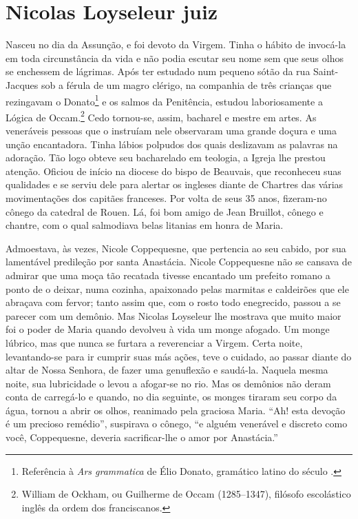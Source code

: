 \chapter{Nicolas Loyseleur juiz}

Nasceu no dia da Assunção, e foi devoto da Virgem. Tinha o hábito de
invocá-la em toda circunstância da vida e não podia escutar seu nome sem
que seus olhos se enchessem de lágrimas. Após ter estudado num pequeno
sótão da rua Saint-Jacques sob a férula de um magro clérigo, na companhia
de três crianças que rezingavam o Donato\footnote{ Referência à
\textit{Ars grammatica} de Élio Donato, gramático latino do século .} 
e os salmos da Penitência, estudou laboriosamente a Lógica de
Occam.\footnote{ William de Ockham, ou Guilherme de Occam (1285--1347),
filósofo escolástico inglês da ordem dos franciscanos.} Cedo
tornou-se, assim, bacharel e mestre em artes. As veneráveis pessoas que o
instruíam nele observaram uma grande doçura e uma unção encantadora. Tinha
lábios polpudos dos quais deslizavam as palavras na adoração. Tão logo
obteve seu bacharelado em teologia, a Igreja lhe prestou atenção. Oficiou
de início na diocese do bispo de Beauvais, que reconheceu suas qualidades
e se serviu dele para alertar os ingleses diante de Chartres das várias
movimentações dos capitães franceses. Por volta de seus 35 anos,
fizeram-no cônego da catedral de Rouen. Lá, foi bom amigo de Jean
Bruillot, cônego e chantre, com o qual salmodiava belas litanias em honra
de Maria.

Admoestava, às vezes, Nicole Coppequesne, que pertencia ao seu cabido, por
sua lamentável predileção por santa Anastácia. Nicole Coppequesne não se
cansava de admirar que uma moça tão recatada tivesse encantado um prefeito
romano a ponto de o deixar, numa cozinha, apaixonado pelas marmitas e
caldeirões que ele abraçava com fervor; tanto assim que, com o rosto todo
enegrecido, passou a se parecer com um demônio. Mas Nicolas Loyseleur lhe
mostrava que muito maior foi o poder de Maria quando devolveu à vida um
monge afogado. Um monge lúbrico, mas que nunca se furtara a reverenciar a
Virgem. Certa noite, levantando-se para ir cumprir suas más ações, teve o
cuidado, ao passar diante do altar de Nossa Senhora, de fazer uma
genuflexão e saudá-la. Naquela mesma noite, sua lubricidade o levou a
afogar-se no rio. Mas os demônios não deram conta de carregá-lo e quando,
no dia seguinte, os monges tiraram seu corpo da água, tornou a abrir os
olhos, reanimado pela graciosa Maria. “Ah! esta devoção é um precioso
remédio'', suspirava o cônego, ``e alguém venerável e discreto como você,
Coppequesne, deveria sacrificar-lhe o amor por Anastácia.”


